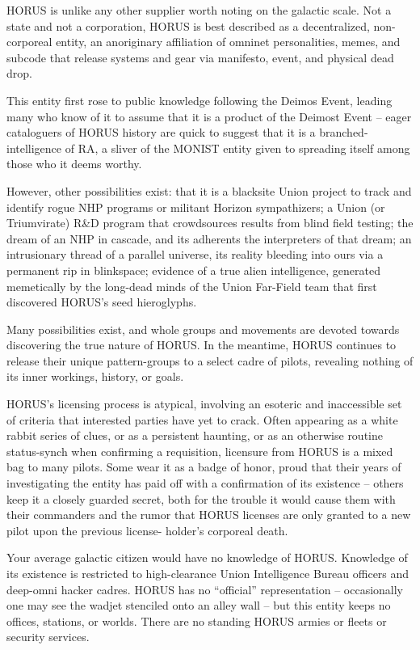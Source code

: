 HORUS is unlike any other supplier worth noting on the galactic scale. Not a state and not a
corporation, HORUS is best described as a decentralized, non-corporeal entity, an anoriginary
affiliation of omninet personalities, memes, and subcode that release systems and gear via
manifesto, event, and physical dead drop.

This entity first rose to public knowledge following the Deimos Event, leading many who know of it
to assume that it is a product of the Deimost Event -- eager cataloguers of HORUS history are
quick to suggest that it is a branched-intelligence of RA, a sliver of the MONIST entity given to
spreading itself among those who it deems worthy.

However, other possibilities exist: that it is a blacksite Union project to track and identify rogue
NHP programs or militant Horizon sympathizers; a Union (or Triumvirate) R\&D program that
crowdsources results from blind field testing; the dream of an NHP in cascade, and its adherents
the interpreters of that dream; an intrusionary thread of a parallel universe, its reality bleeding into
ours via a permanent rip in blinkspace; evidence of a true alien intelligence, generated
memetically by the long-dead minds of the Union Far-Field team that first discovered HORUS’s
seed hieroglyphs.

Many possibilities exist, and whole groups and movements are devoted towards discovering the
true nature of HORUS. In the meantime, HORUS continues to release their unique pattern-groups
to a select cadre of pilots, revealing nothing of its inner workings, history, or goals.

HORUS’s licensing process is atypical, involving an esoteric and inaccessible set of criteria that
interested parties have yet to crack. Often appearing as a white rabbit series of clues, or as a
persistent haunting, or as an otherwise routine status-synch when confirming a requisition,
licensure from HORUS is a mixed bag to many pilots. Some wear it as a badge of honor, proud
that their years of investigating the entity has paid off with a confirmation of its existence -- others
keep it a closely guarded secret, both for the trouble it would cause them with their commanders
and the rumor that HORUS licenses are only granted to a new pilot upon the previous license-
holder’s corporeal death.

Your average galactic citizen would have no knowledge of HORUS. Knowledge of its existence is
restricted to high-clearance Union Intelligence Bureau officers and deep-omni hacker cadres.
HORUS has no “official” representation -- occasionally one may see the wadjet stenciled onto an
alley wall -- but this entity keeps no offices, stations, or worlds. There are no standing HORUS
armies or fleets or security services.

